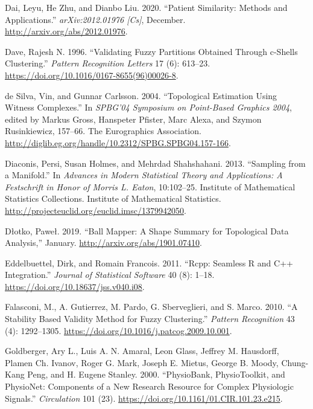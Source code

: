 \documentclass{article}
\newlength{\cslhangindent}
\newlength{\cslentryspacingunit} %
\newenvironment{CSLReferences}[2] %
 {%
  \setlength{\parindent}{0pt}
  \ifodd #1
  \let\oldpar\par
  \def\par{\hangindent=\cslhangindent\oldpar}
  \fi
  \setlength{\parskip}{#2\cslentryspacingunit}
 }%
 {}
\begin{document}
\begin{CSLReferences}{1}{0}
\leavevmode{}%
Dai, Leyu, He Zhu, and Dianbo Liu. 2020. {``Patient Similarity: Methods
and Applications.''} \emph{arXiv:2012.01976 {[}Cs{]}}, December.
\url{http://arxiv.org/abs/2012.01976}.

\leavevmode{}%
Dave, Rajesh N. 1996. {``Validating Fuzzy Partitions Obtained Through
c-Shells Clustering.''} \emph{Pattern Recognition Letters} 17 (6):
613--23. \url{https://doi.org/10.1016/0167-8655(96)00026-8}.

\leavevmode{}%
de Silva, Vin, and Gunnar Carlsson. 2004. {``Topological Estimation
Using Witness Complexes.''} In \emph{{SPBG}'04 {Symposium} on
{Point-Based Graphics} 2004}, edited by Markus Gross, Hanspeter Pfister,
Marc Alexa, and Szymon Rusinkiewicz, 157--66. {The Eurographics
Association}.
\url{http://diglib.eg.org/handle/10.2312/SPBG.SPBG04.157-166}.

\leavevmode{}%
Diaconis, Persi, Susan Holmes, and Mehrdad Shahshahani. 2013.
{``Sampling from a {Manifold}.''} In \emph{Advances in {Modern
Statistical Theory} and {Applications}: {A Festschrift} in Honor of
{Morris L}. {Eaton}}, 10:102--25. Institute of {Mathematical Statistics
Collections}. {Institute of Mathematical Statistics}.
\url{http://projecteuclid.org/euclid.imsc/1379942050}.

\leavevmode{}%
Dłotko, Paweł. 2019. {``Ball Mapper: A Shape Summary for Topological
Data Analysis,''} January. \url{http://arxiv.org/abs/1901.07410}.

\leavevmode{}%
Eddelbuettel, Dirk, and Romain Francois. 2011. {``Rcpp: {Seamless R} and
{C}++ {Integration}.''} \emph{Journal of Statistical Software} 40 (8):
1--18. \url{https://doi.org/10.18637/jss.v040.i08}.

\leavevmode{}%
Falasconi, M., A. Gutierrez, M. Pardo, G. Sberveglieri, and S. Marco.
2010. {``A Stability Based Validity Method for Fuzzy Clustering.''}
\emph{Pattern Recognition} 43 (4): 1292--1305.
\url{https://doi.org/10.1016/j.patcog.2009.10.001}.

\leavevmode{}%
Goldberger, Ary L., Luis A. N. Amaral, Leon Glass, Jeffrey M. Hausdorff,
Plamen Ch. Ivanov, Roger G. Mark, Joseph E. Mietus, George B. Moody,
Chung-Kang Peng, and H. Eugene Stanley. 2000. {``{PhysioBank},
{PhysioToolkit}, and {PhysioNet}: {Components} of a {New Research
Resource} for {Complex Physiologic Signals}.''} \emph{Circulation} 101
(23). \url{https://doi.org/10.1161/01.CIR.101.23.e215}.


\end{CSLReferences}
\end{document}
